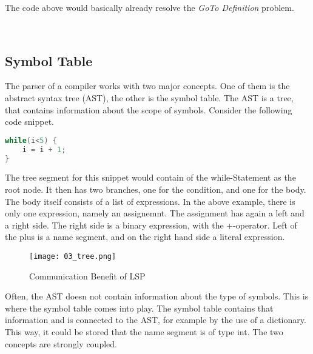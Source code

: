 The code above would basically already resolve the \textit{GoTo Definition} problem.



\\


\subsection{Symbol Table}
The parser of a compiler works with two major concepts.
One of them is the abstract syntax tree (AST), the other is the symbol table.
The AST is a tree, that contains information about the scope of symbols.
Consider the following code snippet.

\begin{lstlisting}[language=csharp, caption={AST Demo Snippet}, captionpos=b, label={lst:astsnipped}]
while(i<5) {
    i = i + 1;
}
\end{lstlisting}

The tree segment for this snippet would contain of the while-Statement as the root node.
It then has two branches, one for the condition, and one for the body.
The body itself consists of a list of expressions.
In the above example, there is only one expression, namely an assignemnt.
The assignment has again a left and a right side.
The right side is a binary expression, with the +-operator.
Left of the plus is a name segment, and on the right hand side a literal expression.\\

\begin{figure}[h]
    \centering
    \texttt{[image: 03\_tree.png]}
    \caption{Communication Benefit of LSP}
    \label{fig:tree_for_example}
\end{figure}

Often, the AST doesn not contain information about the type of symbols.
This is where the symbol table comes into play.
The symbol table contains that information and is connected to the AST, for example by the use of a dictionary.
This way, it could be stored that the name segment  is of type int.
The two concepts are strongly coupled.

